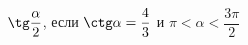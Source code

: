 \begin{ex}[type=simplify_calculate]
	\begin{condition}
		\( \tg\dfrac{\alpha}{2} \), \quad если \( \ctg\alpha=\dfrac{4}{3} \) и \( \pi<\alpha<\dfrac{3\pi}{2} \)
	\end{condition}
\end{ex}
